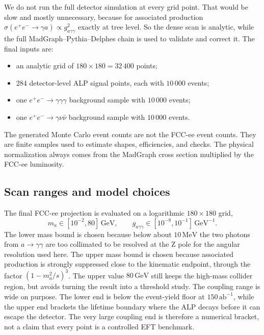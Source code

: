 \documentclass[12pt,a4paper]{article}
\begin{document}
We do not run the full detector simulation at every grid point. That would be
slow and mostly unnecessary, because for associated production
$\sigma(e^+e^-\to\gamma a)\propto g_{a\gamma\gamma}^2$ exactly at tree level.
So the dense scan is analytic, while the full
MadGraph--Pythia--Delphes chain is used to validate and correct it. The final
inputs are:
\begin{itemize}
    \item an analytic grid of $180\times180=32\,400$ points;
    \item 284 detector-level ALP signal points, each with $10\,000$ events;
    \item one $e^+e^-\to\gamma\gamma\gamma$ background sample with
    $10\,000$ events;
    \item one $e^+e^-\to\gamma\nu\bar{\nu}$ background sample with
    $10\,000$ events.
\end{itemize}
The generated Monte Carlo event counts are not the FCC-ee event counts. They
are finite samples used to estimate shapes, efficiencies, and checks. The
physical normalization always comes from the MadGraph cross section multiplied
by the FCC-ee luminosity.

\subsection{Scan ranges and model choices}

The final FCC-ee projection is evaluated on a logarithmic
$180\times180$ grid,
\begin{equation}
    m_{a} \in [10^{-2},80]\,\text{GeV},
    \qquad
    g_{a\gamma\gamma} \in [10^{-8},10^{-1}]\,\text{GeV}^{-1}.
    \label{eq:scan_range}
\end{equation}
The lower mass bound is chosen because below about $10\,\text{MeV}$ the two
photons from $a\to\gamma\gamma$ are too collimated to be resolved at the
Z pole for the angular resolution used here. The upper mass bound is chosen
because associated production is strongly suppressed close to the kinematic
endpoint, through the factor $(1-m_{a}^2/s)^3$. The upper value
$80\,\text{GeV}$ still keeps the high-mass collider region, but avoids turning
the result into a threshold study. The coupling range is wide on purpose. The
lower end is below the event-yield floor at $150\,\text{ab}^{-1}$, while the
upper end brackets the lifetime boundary where the ALP decays before it can
escape the detector. The very large coupling end is therefore a numerical
bracket, not a claim that every point is a controlled EFT benchmark.
\end{document}
